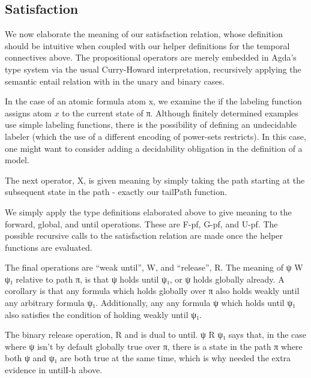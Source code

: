 \documentclass[a4paper, 11pt]{article}
\newcommand{\green}[1]{\textcolor{hooker\'sgreen}{#1}}
\begin{document}
\subsection{Satisfaction}

We now elaborate the meaning of our satisfaction relation, whose definition
should be intuitive when coupled with our helper definitions for the temporal connectives above. The
propositional operators are merely embedded in Agda's type system via the usual
Curry-Howard interpretation, recursively applying the semantic entail relation with in
the unary and binary cases.

In the case of an atomic formula \green{atom x}, we examine the if the labeling
function assigns atom $x$ to the current state of π. Although finitely
determined examples use simple labeling functions, there is the possibility of
defining an undecidable labeler (which the use of a different encoding of
power-sets restricts). In this case, one might want to consider adding a
decidability obligation in the definition of a model.

The next operator, \green{X}, is given meaning by simply taking the path starting at
the subsequent state in the path - exactly our tailPath function.

We simply apply the type definitions elaborated above to give meaning to the
forward, global, and until operations. These are \green{F-pf}, \green{G-pf}, and
\green{U-pf}. The possible recursive calls to the satisfaction relation are made
once the helper functions are evaluated.

The final operations are ``weak until'', \green{W}, and ``release'', \green{R}. The meaning of ψ \green{W} ψ₁
relative to path π, is that ψ holds until ψ₁, or ψ holds globally
already. A corollary is that any formula which holds globally over π also holds
weakly until any arbitrary formula ψ₁. Additionally, any any formula ψ which
holds until ψ₁ also satisfies the condition of holding weakly until ψ₁.

The binary release operation, \green{R} and is dual to until. ψ \green{R} ψ₁ says that, in
the case where ψ isn't by default globally true over π, there is a state in the
path π where both ψ and ψ₁ are both true at the same time, which is why needed
the extra evidence in \green{untilI-h} above.
\end{document}
